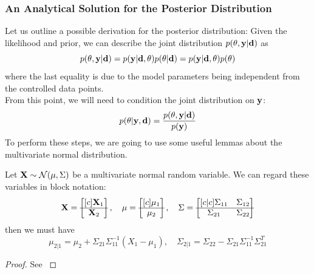 \subsubsection{An Analytical Solution for the Posterior Distribution}
Let us outline a possible derivation for the posterior distribution: Given the likelihood and prior, we can describe the joint distribution $p(\theta, \mathbf{y} | \mathbf{d})$ as
\begin{equation}
  \label{eq:joint}
  p(\theta, \mathbf{y} | \mathbf{d}) = p(\mathbf{y} | \mathbf{d}, \theta)p(\theta | \mathbf{d}) = p(\mathbf{y} | \mathbf{d}, \theta)p(\theta)
\end{equation}
where the last equality is due to the model parameters being independent from the controlled data points. \\
From this point, we will need to condition the joint distribution on $\mathbf{y}$:
\begin{equation}
  \label{eq:joint-conditioned}
  p(\theta | \mathbf{y}, \mathbf{d}) = \frac{p(\theta, \mathbf{y} | \mathbf{d})}{p(\mathbf{y})}
\end{equation}
To perform these steps, we are going to use some useful lemmas about the multivariate normal distribution.
\begin{lemma}
  \label{lemma:block-conditional}
  Let $\mathbf{X} \sim \mathcal{N}(\mathbf{\mu}, \Sigma)$ be a multivariate normal random variable. We can regard these variables in block notation:
  \begin{equation}
  \mathbf{X}=\begin{bmatrix}[c]
    \mathbf{X}_1\\
    \hline
    \mathbf{X}_2
  \end{bmatrix}, \quad \mu = \begin{bmatrix}[c]
    \mu_{1}\\
    \hline
    \mu_{2}
  \end{bmatrix},\quad \Sigma=\begin{bmatrix}[c|c]
  \Sigma_{11} & \Sigma_{12}\\
    \hline
    \Sigma_{21} & \Sigma_{22}
  \end{bmatrix}
\end{equation}
  then we must have
  \begin{equation}\mu_{2|1}=\mu_2 + \Sigma_{21}\Sigma_{11}^{-1}(X_1 - \mu_1),\quad \Sigma_{2|1} = \Sigma_{22} - \Sigma_{21}\Sigma_{11}^{-1}\Sigma_{21}^T\end{equation}
\end{lemma}
\begin{proof}
  See \citet{krause22}
\end{proof}
